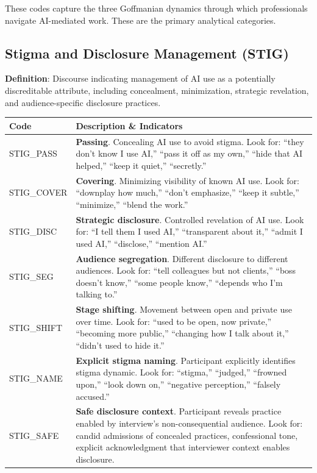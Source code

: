 \documentclass[11pt]{article}
\begin{document}
These codes capture the three Goffmanian dynamics through which professionals navigate AI-mediated work. These are the primary analytical categories.

\subsection{Stigma and Disclosure Management (STIG)}

\begin{tcolorbox}[colback=stigmacolor!10, colframe=stigmacolor!80, title=\textbf{STIG: Stigma and Disclosure Management Codes}, fonttitle=\bfseries\sffamily]

\textbf{Definition}: Discourse indicating management of AI use as a potentially discreditable attribute, including concealment, minimization, strategic revelation, and audience-specific disclosure practices.

\vspace{0.5em}
\begin{tabular}{@{}p{3.5cm}p{10cm}@{}}
\toprule
\textbf{Code} & \textbf{Description \& Indicators} \\
\midrule
STIG\_PASS & \textbf{Passing}. Concealing AI use to avoid stigma. Look for: ``they don't know I use AI,'' ``pass it off as my own,'' ``hide that AI helped,'' ``keep it quiet,'' ``secretly.'' \\[0.5em]
STIG\_COVER & \textbf{Covering}. Minimizing visibility of known AI use. Look for: ``downplay how much,'' ``don't emphasize,'' ``keep it subtle,'' ``minimize,'' ``blend the work.'' \\[0.5em]
STIG\_DISC & \textbf{Strategic disclosure}. Controlled revelation of AI use. Look for: ``I tell them I used AI,'' ``transparent about it,'' ``admit I used AI,'' ``disclose,'' ``mention AI.'' \\[0.5em]
STIG\_SEG & \textbf{Audience segregation}. Different disclosure to different audiences. Look for: ``tell colleagues but not clients,'' ``boss doesn't know,'' ``some people know,'' ``depends who I'm talking to.'' \\[0.5em]
STIG\_SHIFT & \textbf{Stage shifting}. Movement between open and private use over time. Look for: ``used to be open, now private,'' ``becoming more public,'' ``changing how I talk about it,'' ``didn't used to hide it.'' \\[0.5em]
STIG\_NAME & \textbf{Explicit stigma naming}. Participant explicitly identifies stigma dynamic. Look for: ``stigma,'' ``judged,'' ``frowned upon,'' ``look down on,'' ``negative perception,'' ``falsely accused.'' \\[0.5em]
STIG\_SAFE & \textbf{Safe disclosure context}. Participant reveals practice enabled by interview's non-consequential audience. Look for: candid admissions of concealed practices, confessional tone, explicit acknowledgment that interviewer context enables disclosure. \\
\bottomrule
\end{tabular}


\end{tcolorbox}
\end{document}
